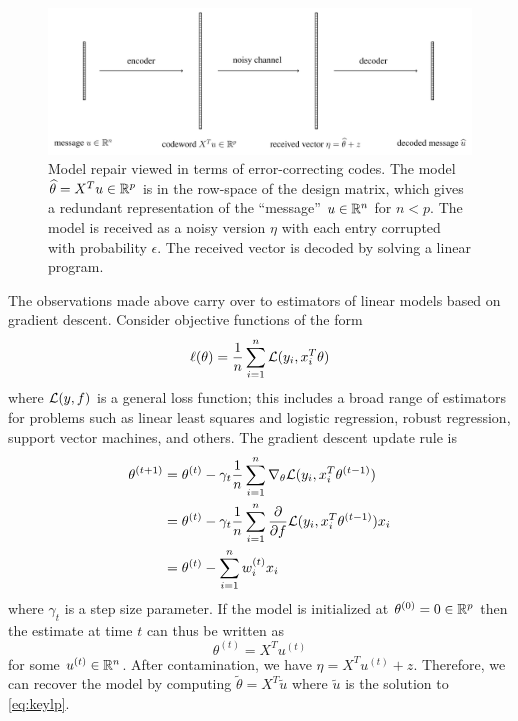 \begin{figure}[t]
  \includegraphics[width=1.0\textwidth]{fig/code}
  \caption{Model repair viewed in terms of error-correcting codes. The model $\widehat\theta = X^T u\in\mathbb{R}^p$ is in the row-space of the design matrix, which gives a redundant representation of the ``message'' $u\in\mathbb{R}^n$ for $n < p$. The model is received as a noisy version $\eta$ with each entry corrupted with probability $\epsilon$. The received vector is decoded by solving a linear program.}
  \label{fig:code}
\end{figure}

The observations made above carry over to estimators of linear models based on gradient descent. Consider objective functions of the form
\begin{equation}
  \ell(\theta) = \frac{1}{n} \sum_{i=1}^n \L(y_i, x_i^T \theta)
\end{equation}
where ${\mathcal L}(y,f)$ is a general loss function; this includes
a broad range of estimators for problems such as linear least squares and logistic regression, robust regression, support vector machines, and others. The gradient descent update rule is
\begin{align}
  \theta^{(t+1)} &= \theta^{(t)} - \gamma_t \frac{1}{n} \sum_{i=1}^n \nabla_\theta \L(y_i, x_i^T \theta^{(t-1)}) \\
  &= \theta^{(t)} - \gamma_t \frac{1}{n} \sum_{i=1}^n \frac{\partial}{\partial f} \L(y_i, x_i^T \theta^{(t-1)}) x_i \\
  &= \theta^{(t)} - \sum_{i=1}^n w_i^{(t)} x_i
\end{align}
where $\gamma_t$ is a step size parameter. If the model is initialized at $\theta^{(0)}= 0\in\mathbb{R}^p$ then the estimate at time $t$ can thus be written as
\begin{equation}
  \theta^{(t)} = X^T u^{(t)}
\end{equation}
for some $u^{(t)}\in \mathbb{R}^n$. After contamination, we have $\eta = X^T u^{(t)} + z$. Therefore, we can recover the model
by computing  $\tilde\theta = X^T \tilde u$ where $\tilde u$ is the solution to \eqref{eq:keylp}.


